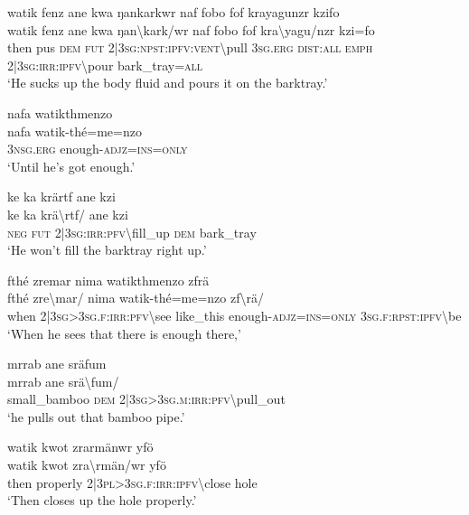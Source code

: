 \ea\label{ex:a4291}
watik fenz ane kwa ŋankarkwr naf fobo fof krayagunzr kzifo\\
\gll watik	fenz	ane	kwa	ŋan{\textbackslash}kark/wr	naf	fobo	fof	kra{\textbackslash}yagu/nzr	kzi=fo\\
     then	pus	\textsc{dem}	\textsc{fut}	2|3\textsc{sg}:\textsc{npst}:\textsc{ipfv}:\textsc{vent}{\textbackslash}pull	3\textsc{sg}.\textsc{erg}	\textsc{dist}:\textsc{all}	\textsc{emph}	2|3\textsc{sg}:\textsc{irr}:\textsc{ipfv}{\textbackslash}pour	bark\_tray=\textsc{all}\\
\glt `He sucks up the body fluid and pours it on the barktray.'
\z

\ea\label{ex:a4293}
nafa watikthmenzo\\
\gll nafa	watik-thé=me=nzo\\
     3\textsc{nsg}.\textsc{erg}	enough-\textsc{adjz}=\textsc{ins}=\textsc{only}\\
\glt `Until he's got enough.'
\z

\ea\label{ex:a4294}
ke ka krärtf ane kzi\\
\gll ke	ka	krä{\textbackslash}rtf/	ane	kzi\\
     \textsc{neg}	\textsc{fut}	2|3\textsc{sg}:\textsc{irr}:\textsc{pfv}{\textbackslash}fill\_up	\textsc{dem}	bark\_tray\\
\glt `He won't fill the barktray right up.'
\z

\ea\label{ex:a4295}
fthé zremar nima watikthmenzo zfrä\\
\gll fthé	zre{\textbackslash}mar/	nima	watik-thé=me=nzo	zf{\textbackslash}rä/\\
     when	2|3\textsc{sg}>3\textsc{sg}.\textsc{f}:\textsc{irr}:\textsc{pfv}{\textbackslash}see	like\_this	enough-\textsc{adjz}=\textsc{ins}=\textsc{only}	3\textsc{sg}.\textsc{f}:\textsc{rpst}:\textsc{ipfv}{\textbackslash}be\\
\glt `When he sees that there is enough there,'
\z

\ea\label{ex:a4296}
mrrab ane sräfum\\
\gll mrrab	ane	srä{\textbackslash}fum/\\
     small\_bamboo	\textsc{dem}	2|3\textsc{sg}>3\textsc{sg}.\textsc{m}:\textsc{irr}:\textsc{pfv}{\textbackslash}pull\_out\\
\glt `he pulls out that bamboo pipe.'
\z

\ea\label{ex:a4297}
watik kwot zrarmänwr yfö\\
\gll watik	kwot	zra{\textbackslash}rmän/wr	yfö\\
     then	properly	2|3\textsc{pl}>3\textsc{sg}.\textsc{f}:\textsc{irr}:\textsc{ipfv}{\textbackslash}close	hole\\
\glt `Then closes up the hole properly.'
\z

